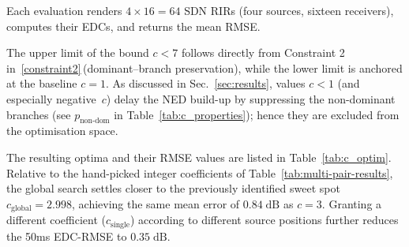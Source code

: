 \documentclass[journal]{IEEEtran}
\begin{document}

Each evaluation renders $4\times16=64$ SDN RIRs (four sources, sixteen
receivers), computes their EDCs, and returns the mean RMSE.

The upper limit of the bound \(c<7\) follows directly from Constraint 2 in~\eqref{constraint2}\,(dominant–branch preservation), while the lower limit is anchored at the baseline \(c=1\). 
As discussed in Sec.~\ref{sec:results}, values \(c<1\) (and especially negative~\(c\)) delay the NED build-up by suppressing the non-dominant branches
(see \(p_{\text{non-dom}}\) in Table~\ref{tab:c_properties}); 
hence they are excluded from the optimisation space. 

The resulting optima and their RMSE values are listed in Table~\ref{tab:c_optim}.  
Relative to the hand-picked integer coefficients of Table~\ref{tab:multi-pair-results},  
the global search settles closer to the previously identified sweet spot \(c_{\text{global}} = 2.998\), achieving the same mean error of 
\(0.84\;\text{dB}\) as \(c\!=\!3\).
Granting a different coefficient (\(c_{\text{single}}\)) according to different source positions further reduces the 50ms EDC-RMSE to \(0.35\;\text{dB}\).

\end{document}
